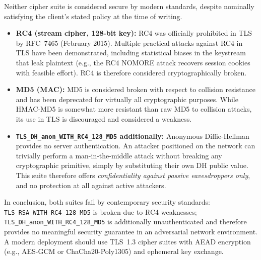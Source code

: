 \documentclass[]{scrartcl}
\begin{document}
{Neither cipher suite is considered secure by modern standards, despite nominally
satisfying the client's stated policy at the time of writing.

\begin{itemize}
    \item \textbf{RC4 (stream cipher, 128-bit key):}
          RC4 was officially prohibited in TLS by RFC~7465 (February 2015).
          Multiple practical attacks against RC4 in TLS have been demonstrated,
          including statistical biases in the keystream that leak plaintext
          (e.g., the RC4 NOMORE attack recovers session cookies with feasible effort).
          RC4 is therefore considered cryptographically broken.

    \item \textbf{MD5 (MAC):}
          MD5 is considered broken with respect to collision resistance and has been
          deprecated for virtually all cryptographic purposes.
          While HMAC-MD5 is somewhat more resistant than raw MD5 to collision attacks,
          its use in TLS is discouraged and considered a weakness.

    \item \textbf{\texttt{TLS\_DH\_anon\_WITH\_RC4\_128\_MD5} additionally:}
          Anonymous Diffie-Hellman provides no server authentication.
          An attacker positioned on the network can trivially perform a
          man-in-the-middle attack without breaking any cryptographic primitive,
          simply by substituting their own DH public value.
          This suite therefore offers \emph{confidentiality against passive eavesdroppers
          only}, and no protection at all against active attackers.
\end{itemize}

In conclusion, both suites fail by contemporary security standards:
\texttt{TLS\_RSA\_WITH\_RC4\_128\_MD5} is broken due to RC4 weaknesses;
\texttt{TLS\_DH\_anon\_WITH\_RC4\_128\_MD5} is additionally unauthenticated and
therefore provides no meaningful security guarantee in an adversarial network environment.
A modern deployment should use TLS~1.3 cipher suites with AEAD encryption
(e.g., AES-GCM or ChaCha20-Poly1305) and ephemeral key exchange.
}
\end{document}
